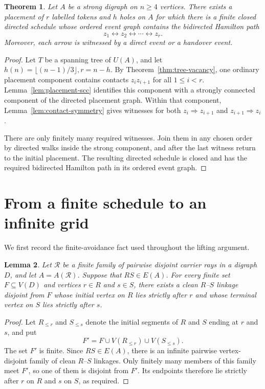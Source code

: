 \documentclass[11pt]{article}
\newtheorem{theorem}{Theorem}[section]
\newtheorem{lemma}[theorem]{Lemma}
\theoremstyle{remark}
\newcommand{\cR}{\mathcal{R}}
\numberwithin{equation}{section}
\begin{document}
\begin{theorem}\label{thm:directed-augmentation}
Let $A$ be a strong digraph on $n\ge4$ vertices. There exists a placement of $r$ labelled tokens and $h$ holes on $A$ for which there is a finite closed directed schedule whose ordered event graph contains the bidirected Hamilton path
\[
z_1\leftrightarrow z_2\leftrightarrow\cdots\leftrightarrow z_r.
\]
Moreover, each arrow is witnessed by a direct event or a handover event.
\end{theorem}

\begin{proof}
Let $T$ be a spanning tree of $U(A)$, and let $h(n)=\lfloor(n-1)/3\rfloor,r=n-h$. By Theorem~\ref{thm:tree-vacancy}, one ordinary placement component contains contacts $z_iz_{i+1}$ for all $1\le i<r$. Lemma~\ref{lem:placement-scc} identifies this component with a strongly connected component of the directed placement graph. Within that component, Lemma~\ref{lem:contact-symmetry} gives witnesses for both $z_i\Rightarrow z_{i+1}$ and $z_{i+1}\Rightarrow z_i$.

There are only finitely many required witnesses. Join them in any chosen order by directed walks inside the strong component, and after the last witness return to the initial placement. The resulting directed schedule is closed and has the required bidirected Hamilton path in its ordered event graph.
\end{proof}

\section{From a finite schedule to an infinite grid}

We first record the finite-avoidance fact used throughout the lifting argument.

\begin{lemma}\label{lem:fresh}
Let $\cR$ be a finite family of pairwise disjoint carrier rays in a digraph $D$, and let $A=A(\cR)$. Suppose that $RS\in E(A)$. For every finite set $F\subseteq V(D)$ and vertices $r\in R$ and $s\in S$, there exists a clean $R$--$S$ linkage disjoint from $F$ whose initial vertex on $R$ lies strictly after $r$ and whose terminal vertex on $S$ lies strictly after $s$.
\end{lemma}

\begin{proof}
Let $R_{\le r}$ and $S_{\le s}$ denote the initial segments of $R$ and $S$ ending at $r$ and $s$, and put
\[
F'=F\cup V(R_{\le r})\cup V(S_{\le s}).
\]
The set $F'$ is finite. Since $RS\in E(A)$, there is an infinite pairwise vertex-disjoint family of clean $R$--$S$ linkages. Only finitely many members of this family meet $F'$, so one of them is disjoint from $F'$. Its endpoints therefore lie strictly after $r$ on $R$ and $s$ on $S$, as required.
\end{proof}
\end{document}

